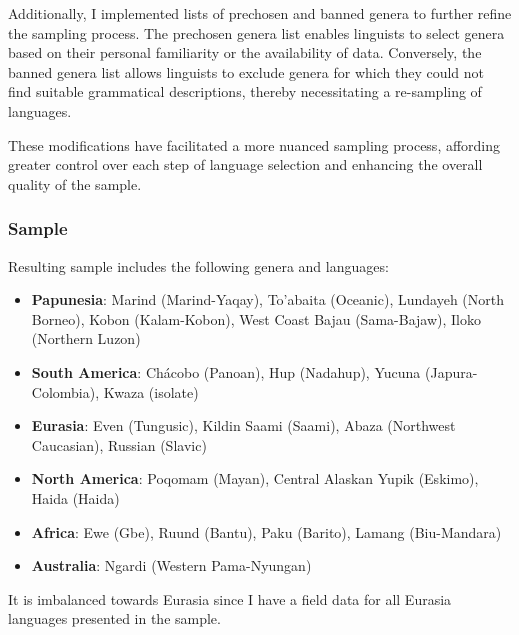 Additionally, I implemented lists of prechosen and banned genera to further refine the sampling process. The prechosen genera list enables linguists to select genera based on their personal familiarity or the availability of data. Conversely, the banned genera list allows linguists to exclude genera for which they could not find suitable grammatical descriptions, thereby necessitating a re-sampling of languages.

These modifications have facilitated a more nuanced sampling process, affording greater control over each step of language selection and enhancing the overall quality of the sample.

\subsubsection{Sample}

Resulting sample includes the following genera and languages:

\begin{itemize}
	\item \textbf{Papunesia}: Marind (Marind-Yaqay), To'abaita (Oceanic), Lundayeh (North Borneo), Kobon (Kalam-Kobon), West Coast Bajau (Sama-Bajaw), Iloko (Northern Luzon)
	\item \textbf{South America}: Chácobo (Panoan), Hup (Nadahup), Yucuna (Japura-Colombia), Kwaza (isolate)
	\item \textbf{Eurasia}: Even (Tungusic), Kildin Saami (Saami), Abaza (Northwest Caucasian), Russian (Slavic)
	\item \textbf{North America}: Poqomam (Mayan), Central Alaskan Yupik (Eskimo), Haida (Haida)
	\item \textbf{Africa}: Ewe (Gbe), Ruund (Bantu), Paku (Barito), Lamang (Biu-Mandara)
	\item \textbf{Australia}: Ngardi (Western Pama-Nyungan)
\end{itemize}

It is imbalanced towards Eurasia since I have a field data for all Eurasia languages presented in the sample.




